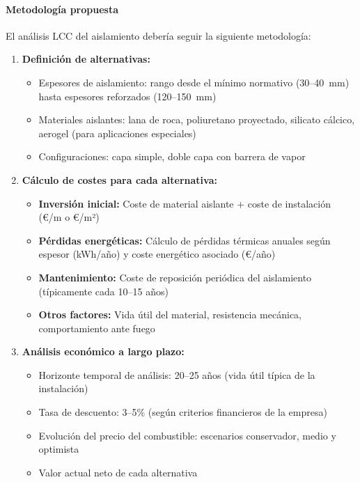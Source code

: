 \paragraph{Metodología propuesta}

El análisis LCC del aislamiento debería seguir la siguiente metodología:

\begin{enumerate}[label=\arabic*., leftmargin=2em]
	\item \textbf{Definición de alternativas:}
	      \begin{itemize}[noitemsep]
		      \item Espesores de aislamiento: rango desde el mínimo normativo (30--40~mm) hasta espesores reforzados (120--150~mm)
		      \item Materiales aislantes: lana de roca, poliuretano proyectado, silicato cálcico, aerogel (para aplicaciones especiales)
		      \item Configuraciones: capa simple, doble capa con barrera de vapor
	      \end{itemize}

	\item \textbf{Cálculo de costes para cada alternativa:}
	      \begin{itemize}[noitemsep]
		      \item \textbf{Inversión inicial:} Coste de material aislante + coste de instalación (€/m o €/m²)
		      \item \textbf{Pérdidas energéticas:} Cálculo de pérdidas térmicas anuales según espesor (kWh/año) y coste energético asociado (€/año)
		      \item \textbf{Mantenimiento:} Coste de reposición periódica del aislamiento (típicamente cada 10--15 años)
		      \item \textbf{Otros factores:} Vida útil del material, resistencia mecánica, comportamiento ante fuego
	      \end{itemize}

	\item \textbf{Análisis económico a largo plazo:}
	      \begin{itemize}[noitemsep]
		      \item Horizonte temporal de análisis: 20--25 años (vida útil típica de la instalación)
		      \item Tasa de descuento: 3--5\% (según criterios financieros de la empresa)
		      \item Evolución del precio del combustible: escenarios conservador, medio y optimista
		      \item Valor actual neto de cada alternativa
	      \end{itemize}


\end{enumerate}
